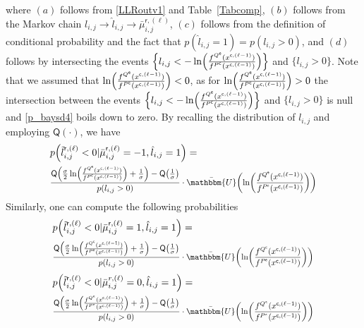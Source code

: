 \documentclass[journal]{IEEEtran}
\newcommand{\mep}{{x}}
\newcommand{\row}{\mathsf{r}}
\newcommand{\col}{\mathsf{c}}
\newcommand{\Q}{\mathsf{Q}}
\newcommand{\Pue}{P^{\mathsf{e}}}
\newcommand{\Que}{Q^{\mathsf{e}}}
\newcommand{\Puc}{P^{\mathsf{c}}}
\newcommand{\Quc}{Q^{\mathsf{c}}}
\newcommand{\Puep}{P^{\mathsf{\epsilon}}}
\newcommand{\Quep}{Q^{\mathsf{\epsilon}}}
\newcommand{\opt}{\tilde{l}}
\let\originalleft\left
\let\originalright\right
\renewcommand{\left}{\mathopen{}\mathclose\bgroup\originalleft}
\renewcommand{\right}{\aftergroup\egroup\originalright}
\newcommand\scalemath[2]{\scalebox{#1}{\mbox{\ensuremath{\displaystyle #2}}}}   %
\begin{document}
where $(a)$ follows from \eqref{LLRoutv1} and Table~\ref{Tabcomp}, $(b)$ follows from the Markov chain $l_{i,j} \to \hat l_{i,j} \to \bar \mu _{i,j}^{\row,(\ell )}$, $(c)$ follows from the definition of conditional probability and the fact that $p(\hat l_{i,j}=1)=p(l_{i,j}>0)$, and $(d)$ follows by intersecting the events $\Big\{l_{i,j}< -\ln \left( \frac{f^{\Que}(\mep^{\col,(\ell-1)})}{f^{\Puc}(\mep^{\col,(\ell-1)})}\right)\Big\}$ and $\{l_{i,j}>0\}$. Note that we assumed that $\ln \left(\frac{f^{\Que}(\mep^{\col,(\ell-1)})}{f^{\Puc}(\mep^{\col,(\ell-1)})}\right)<0$, as for $\ln \left(\frac{f^{\Que}(\mep^{\col,(\ell-1)})}{f^{\Puc}(\mep^{\col,(\ell-1)})}\right)>0$ the intersection between the events $\Big\{l_{i,j}< -\ln \left( \frac{f^{\Que}(\mep^{\col,(\ell-1)})}{f^{\Puc}(\mep^{\col,(\ell-1)})}\right)\Big\}$ and $\{l_{i,j}>0\}$ is null and \eqref{p_baysd4} boils down to zero. By recalling the distribution of $l_{i,j}$ and employing $\Q(\cdot)$, we have
\begin{align}\label{p_baysd44}
& \nonumber {p\left(\opt_{i,j}^{\mathsf r, (\ell)} < 0|\bar \mu _{i,j}^{\row,(\ell )}=-1,{{\hat l}_{i,j}=1}\right)}= \\ &  
\scalemath{0.85}{\frac{{\Q\left( { \frac{\sigma}{2}\ln \left(\frac{f^{\Que}(\mep^{\col,(\ell-1)})}{f^{\Puc}(\mep^{\col,(\ell-1)})}\right)+\frac{1}{\sigma}} \right)}-\Q\left(\frac{1}{\sigma}\right)}{p(l_{i,j}>0)}\cdot \bar{\mathbbm{U}} \left( \ln \left(\frac{f^{\Que}(\mep^{\col,(\ell-1)})}{f^{\Puc}(\mep^{\col,(\ell-1)})}\right) \right)}
\end{align}
Similarly, one can compute the following probabilities
\begin{align}\label{p_baysd5}
& \nonumber {p\left(\opt_{i,j}^{\mathsf r, (\ell)} < 0|\bar \mu _{i,j}^{\row,(\ell )}=1,{{\hat l}_{i,j}=1}\right)}= \\ & \scalemath{0.83}{\frac{{\Q\left( { \frac{\sigma}{2}\ln \left(\frac{f^{\Quc}(\mep^{\col,(\ell-1)})}{f^{\Pue}(\mep^{\col,(\ell-1)})}\right)+\frac{1}{\sigma}} \right)}-\Q\left(\frac{1}{\sigma}\right)}{p(l_{i,j}>0)}\cdot \bar{\mathbbm{U}} \left( \ln \left(\frac{f^{\Quc}(\mep^{\col,(\ell-1)})}{f^{\Pue}(\mep^{\col,(\ell-1)})}\right) \right)}
\end{align}
\begin{align}\label{p_baysd6}
& \nonumber {p\left(\opt_{i,j}^{\mathsf r, (\ell)} < 0|\bar \mu _{i,j}^{r,(\ell )}=0,{{\hat l}_{i,j}=1}\right)}= \\ &  \scalemath{0.83}{\frac{{\Q\left( { \frac{\sigma}{2}\ln \left(\frac{f^{\Quep}(\mep^{\col,(\ell-1)})}{f^{\Puep}(\mep^{\col,(\ell-1)})}\right)+\frac{1}{\sigma}} \right)}-\Q\left(\frac{1}{\sigma}\right)}{p(l_{i,j}>0)}\cdot \bar{\mathbbm{U}} \left( \ln \left(\frac{f^{\Quep}(\mep^{\col,(\ell-1)})}{f^{\Puep}(\mep^{\col,(\ell-1)})}\right) \right)}
\end{align}
\end{document}
